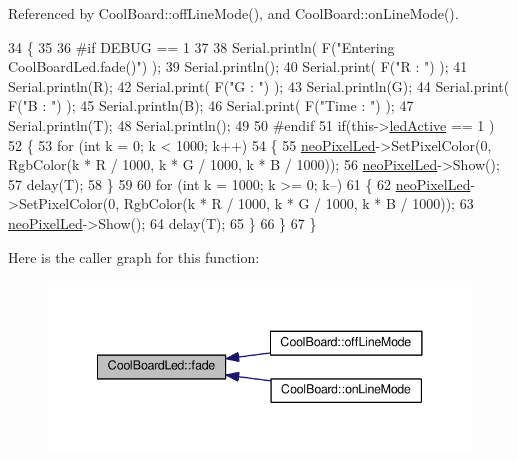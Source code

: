 Referenced by Cool\+Board\+::off\+Line\+Mode(), and Cool\+Board\+::on\+Line\+Mode().


\begin{DoxyCode}
34 \{
35 
36 \textcolor{preprocessor}{#if DEBUG == 1}
37 
38     Serial.println( F(\textcolor{stringliteral}{"Entering CoolBoardLed.fade()"}) );
39     Serial.println();
40     Serial.print( F(\textcolor{stringliteral}{"R : "}) );
41     Serial.println(R);
42     Serial.print( F(\textcolor{stringliteral}{"G : "}) );
43     Serial.println(G);
44     Serial.print( F(\textcolor{stringliteral}{"B : "}) );
45     Serial.println(B);
46     Serial.print( F(\textcolor{stringliteral}{"Time : "}) );
47     Serial.println(T);
48     Serial.println();
49 
50 \textcolor{preprocessor}{#endif  }
51     \textcolor{keywordflow}{if}(this->\hyperlink{classCoolBoardLed_a5f17c135516fcf4b44ea8a096ba0177a}{ledActive} == 1 )
52     \{
53         \textcolor{keywordflow}{for} (\textcolor{keywordtype}{int} k = 0; k < 1000; k++) 
54         \{
55             \hyperlink{classCoolBoardLed_ac2c13fa462a010cd9242bf297c013923}{neoPixelLed}->SetPixelColor(0, RgbColor(k * R / 1000, k * G / 1000, k * B / 1000));
56             \hyperlink{classCoolBoardLed_ac2c13fa462a010cd9242bf297c013923}{neoPixelLed}->Show();
57             delay(T);
58         \}
59         
60         \textcolor{keywordflow}{for} (\textcolor{keywordtype}{int} k = 1000; k >= 0; k--) 
61         \{
62             \hyperlink{classCoolBoardLed_ac2c13fa462a010cd9242bf297c013923}{neoPixelLed}->SetPixelColor(0, RgbColor(k * R / 1000, k * G / 1000, k * B / 1000));
63             \hyperlink{classCoolBoardLed_ac2c13fa462a010cd9242bf297c013923}{neoPixelLed}->Show();
64             delay(T);
65         \}
66     \}
67 \}
\end{DoxyCode}
Here is the caller graph for this function\+:
\nopagebreak
\begin{figure}[H]
\begin{center}
\leavevmode
\includegraphics[width=341pt]{classCoolBoardLed_af1cacbaa88db8bcf6042c1083ba41155_icgraph}
\end{center}
\end{figure}
\mbox{\label{classCoolBoardLed_ab778f5e7bed0ab74e3906d82110493c3}} 
